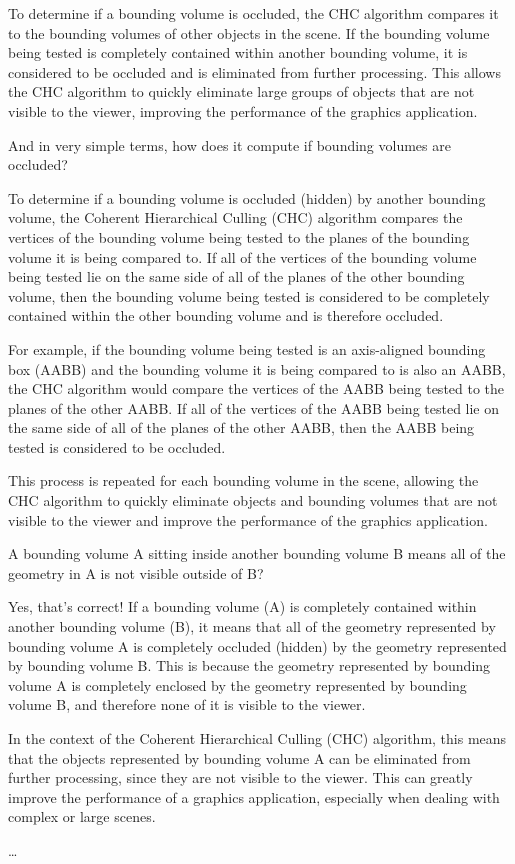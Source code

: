 \begin{description}
	To determine if a bounding volume is occluded, the CHC algorithm compares it to the bounding volumes of other objects in the scene. If the bounding volume being tested is completely contained within another bounding volume, it is considered to be occluded and is eliminated from further processing. This allows the CHC algorithm to quickly eliminate large groups of objects that are not visible to the viewer, improving the performance of the graphics application.

	\me And in very simple terms, how does it compute if bounding volumes are occluded?

	\gpt To determine if a bounding volume is occluded (hidden) by another bounding volume, the Coherent Hierarchical Culling (CHC) algorithm compares the vertices of the bounding volume being tested to the planes of the bounding volume it is being compared to. If all of the vertices of the bounding volume being tested lie on the same side of all of the planes of the other bounding volume, then the bounding volume being tested is considered to be completely contained within the other bounding volume and is therefore occluded.

	For example, if the bounding volume being tested is an axis-aligned bounding box (AABB) and the bounding volume it is being compared to is also an AABB, the CHC algorithm would compare the vertices of the AABB being tested to the planes of the other AABB. If all of the vertices of the AABB being tested lie on the same side of all of the planes of the other AABB, then the AABB being tested is considered to be occluded.

	This process is repeated for each bounding volume in the scene, allowing the CHC algorithm to quickly eliminate objects and bounding volumes that are not visible to the viewer and improve the performance of the graphics application.

	\me A bounding volume A sitting inside another bounding volume B means all of the geometry in A is not visible outside of B?

	\gpt Yes, that's correct! If a bounding volume (A) is completely contained within another bounding volume (B), it means that all of the geometry represented by bounding volume A is completely occluded (hidden) by the geometry represented by bounding volume B. This is because the geometry represented by bounding volume A is completely enclosed by the geometry represented by bounding volume B, and therefore none of it is visible to the viewer.

	In the context of the Coherent Hierarchical Culling (CHC) algorithm, this means that the objects represented by bounding volume A can be eliminated from further processing, since they are not visible to the viewer. This can greatly improve the performance of a graphics application, especially when dealing with complex or large scenes.

	\dots
\end{description}